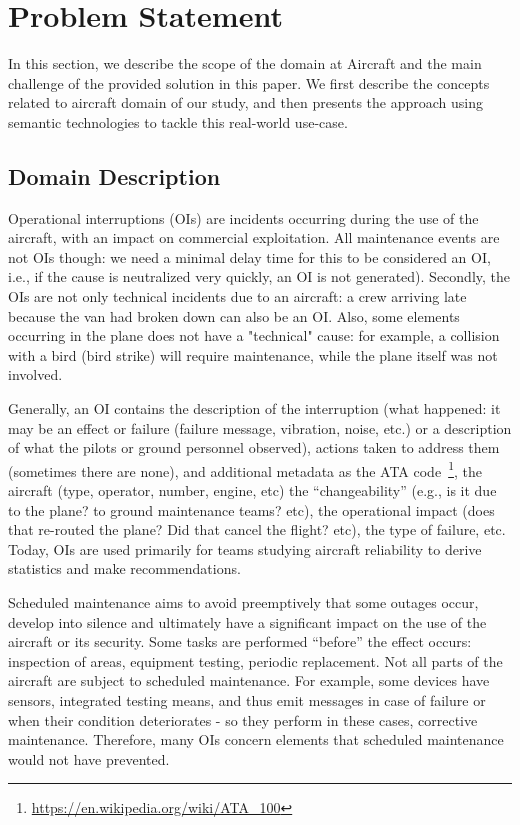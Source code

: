 \documentclass[runningheads,a4paper]{{llncs}}
\newcommand{\todo}[1]{\noindent\textcolor{red}{{\bf \{TODO}: #1{\bf \}}}}
\begin{document}



\section{Problem Statement}
\label{sec:statement}
In this section, we describe the scope of the domain at Aircraft and the main challenge of the provided solution in this paper. We first describe the concepts related to aircraft domain of our study, and then presents the approach using semantic technologies to tackle this real-world use-case.

\subsection{Domain Description}
Operational interruptions (OIs) are incidents occurring during the use of the aircraft, with an impact on commercial exploitation. All maintenance events are not OIs though: we need a minimal delay time for this to be considered an OI, i.e., if the cause is neutralized very quickly, an OI is not generated). Secondly, the OIs are not only technical incidents due to an aircraft: a crew arriving late because the van had broken down can also be an OI. Also, some elements occurring in the plane does not have a "technical" cause: for example, a collision with a bird (bird strike) will require maintenance, while the plane itself was not involved.

Generally, an OI contains the description of the interruption (what happened: it may be an effect or failure (failure message, vibration, noise, etc.) or a description of what the pilots or ground personnel observed), actions taken to address them (sometimes there are none), and additional metadata as the ATA code~\footnote{\url{https://en.wikipedia.org/wiki/ATA_100}}, the aircraft (type, operator, number, engine, etc) the ``changeability'' (e.g., is it due to the plane? to ground maintenance teams? etc), the operational impact (does that re-routed the plane? Did that cancel the flight? etc), the type of failure, etc. Today, OIs are used primarily for teams studying aircraft reliability to derive statistics and make recommendations. 

Scheduled maintenance aims to avoid preemptively that some outages occur, develop into silence and ultimately have a significant impact on the use of the aircraft or its security. Some tasks are performed ``before'' the effect occurs: inspection of areas, equipment testing, periodic replacement.
Not all parts of the aircraft are subject to scheduled maintenance. For example, some devices have sensors, integrated testing means, and thus emit messages in case of failure or when their condition deteriorates - so they perform in these cases, corrective maintenance. Therefore, many OIs concern elements that scheduled maintenance would not have prevented.
\end{document}
